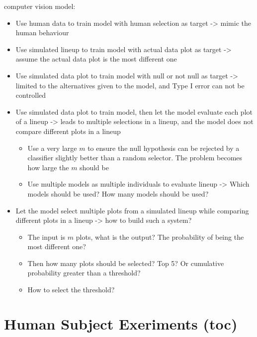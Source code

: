 \documentclass{monashthesis}
\theoremstyle{definition}
\theoremstyle{definition}
\theoremstyle{definition}
\theoremstyle{definition}
\theoremstyle{remark}
\begin{document}
computer vision model:

\begin{itemize}
\tightlist
\item
  Use human data to train model with human selection as target -\textgreater{} mimic the human behaviour
\item
  Use simulated lineup to train model with actual data plot as target -\textgreater{} assume the actual data plot is the most different one
\item
  Use simulated data plot to train model with null or not null as target -\textgreater{} limited to the alternatives given to the model, and Type I error can not be controlled
\item
  Use simulated data plot to train model, then let the model evaluate each plot of a lineup -\textgreater{} leads to multiple selections in a lineup, and the model does not compare different plots in a lineup

  \begin{itemize}
  \tightlist
  \item
    Use a very large \(m\) to ensure the null hypothesis can be rejected by a classifier slightly better than a random selector. The problem becomes how large the \(m\) should be
  \item
    Use multiple models as multiple individuals to evaluate lineup -\textgreater{} Which models should be used? How many models should be used?
  \end{itemize}
\item
  Let the model select multiple plots from a simulated lineup while comparing different plots in a lineup -\textgreater{} how to build such a system?

  \begin{itemize}
  \tightlist
  \item
    The input is \(m\) plots, what is the output? The probability of being the most different one?
  \item
    Then how many plots should be selected? Top 5? Or cumulative probability greater than a threshold?
  \item
    How to select the threshold?
  \end{itemize}
\end{itemize}

\hypertarget{human-subject-exeriments-toc}{%
\chapter{Human Subject Exeriments (toc)}\label{human-subject-exeriments-toc}}
\end{document}
